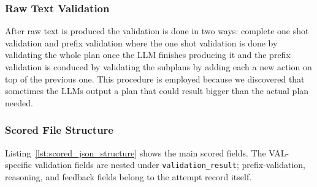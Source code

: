 \subsubsection{Raw Text Validation}
After raw text is produced the validation is done in two ways: complete one shot validation and prefix validation where the one shot validation is done by validating the whole plan once the LLM finishes producing it and the prefix validation is conduced by validating the subplans by adding each a new action on top of the previous one.
This procedure is employed because we discovered that sometimes the LLMs output a plan that could result bigger than the actual plan needed.

\subsubsection{Scored File Structure}

Listing~\ref{lst:scored_json_structure} shows the main scored fields. The VAL-specific validation fields are nested under \texttt{validation\_result}; prefix-validation, reasoning, and feedback fields belong to the attempt record itself.

